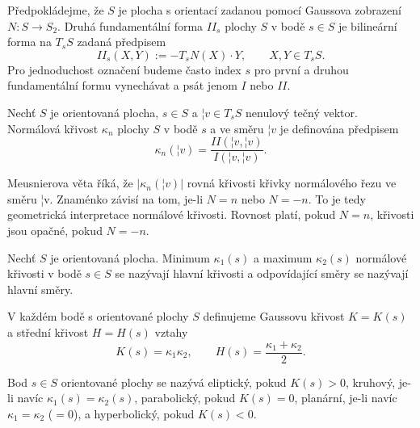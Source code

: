 \documentclass[12pt]{article}                   %
\begin{document}
        \begin{definice}
            Předpokládejme, že $S$ je plocha s orientací zadanou pomocí Gaussova zobrazení $N: S \rightarrow S_2$. Druhá fundamentální forma $II_s$ plochy $S$ v bodě $s \in S$ je bilineární forma na $T_sS$ zadaná předpisem
            $$ II_s(X, Y) := -T_sN(X)·Y, \qquad X, Y \in T_sS. $$
            Pro jednoduchost označení budeme často index $s$ pro první a druhou fundamentální formu vynechávat a psát jenom $I$ nebo $II$.
        \end{definice}

        \begin{definice}
            Nechť $S$ je orientovaná plocha, $s \in S$ a $¦v \in T_sS$ nenulový tečný vektor. Normálová křivost $\kappa_n$ plochy $S$ v bodě $s$ a ve směru $¦v$ je definována předpisem
            $$ \kappa_n(¦v) = \frac{II(¦v, ¦v)}{I(¦v, ¦v)}. $$

            \begin{poznamkain}
                Meusnierova věta říká, že $|\kappa_n(¦v)|$ rovná křivosti křivky normálového řezu ve směru ¦v. Znaménko závisí na tom, je-li $N = n$ nebo $N = -n$. To je tedy geometrická interpretace normálové křivosti. Rovnost platí, pokud $N = n$, křivosti jsou opačné, pokud $N = -n$.
            \end{poznamkain}
        \end{definice}

        \begin{definice}
            Nechť $S$ je orientovaná plocha. Minimum $\kappa_1(s)$ a maximum $\kappa_2(s)$ normálové křivosti v bodě $s \in S$ se nazývají hlavní křivosti a odpovídající směry se nazývají hlavní směry.

            V každém bodě s orientované plochy $S$ definujeme Gaussovu křivost $K = K(s)$ a střední křivost $H = H(s)$ vztahy
            $$ K(s) = \kappa_1\kappa_2, \qquad H(s) = \frac{\kappa_1 + \kappa_2}{2}. $$
        \end{definice}

        \begin{definice}
            Bod $s \in S$ orientované plochy se nazývá eliptický, pokud $K(s) > 0$, kruhový, je-li navíc $\kappa_1(s) = \kappa_2(s)$, parabolický, pokud $K(s) = 0$, planární, je-li navíc $\kappa_1 = \kappa_2$ ($= 0$), a hyperbolický, pokud $K(s) < 0$.
        \end{definice}
\end{document}
